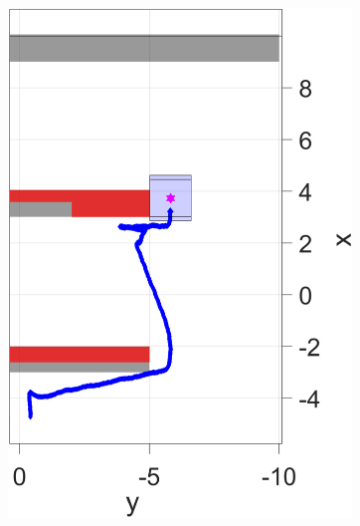 \begin{figure}
\begin{subfigure}[t]{0.35\columnwidth}
    \includegraphics[width=\columnwidth]{fig/763}
    \caption{}
  \end{subfigure}
  

\end{figure}
